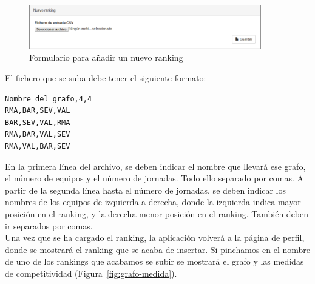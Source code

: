 \begin{figure}[htb]
\centering
\includegraphics[width=0.9\textwidth]{imagenes/pantallazos-aplicacion/nuevo-ranking}
\caption{Formulario para añadir un nuevo ranking}
\label{fig:nuevo-ranking}
\end{figure}

El fichero que se suba debe tener el siguiente formato:

\begin{verbatim}
Nombre del grafo,4,4
RMA,BAR,SEV,VAL
BAR,SEV,VAL,RMA
RMA,BAR,VAL,SEV
RMA,VAL,BAR,SEV
\end{verbatim}

En la primera línea del archivo, se deben indicar el nombre que llevará ese grafo, el número de equipos y el número de jornadas. Todo ello separado por comas. A partir de la segunda línea hasta el número de jornadas, se deben indicar los nombres de los equipos de izquierda a derecha, donde la izquierda indica mayor posición en el ranking, y la derecha menor posición en el ranking. También deben ir separados por comas.\\

Una vez que se ha cargado el ranking, la aplicación volverá a la página de perfil, donde se mostrará el ranking que se acaba de insertar. Si pinchamos en el nombre de uno de los rankings que acabamos se subir se mostrará el grafo y las medidas de competitividad (Figura~\ref{fig:grafo-medida}). 

